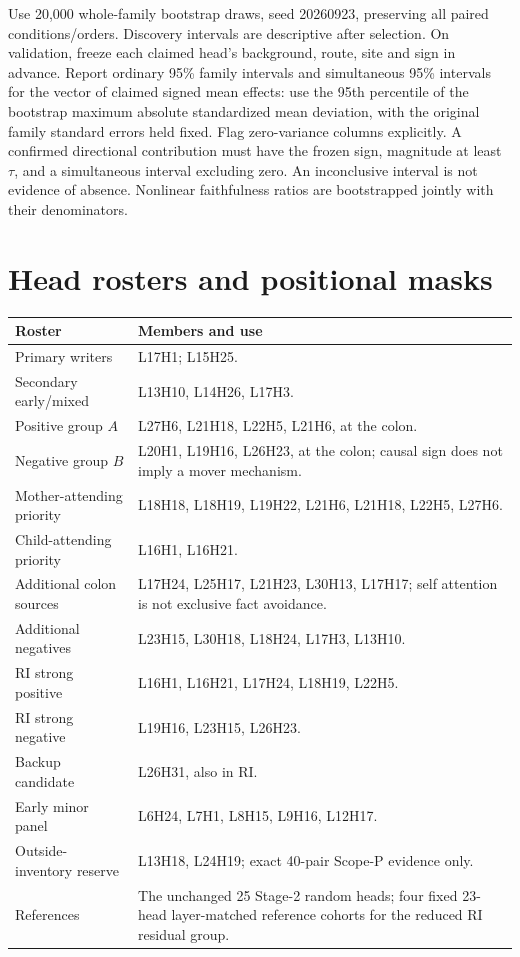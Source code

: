 \documentclass[11pt,a4paper]{article}
\begin{document}
Use 20,000 whole-family bootstrap draws, seed 20260923, preserving all paired
conditions/orders. Discovery intervals are descriptive after selection. On validation,
freeze each claimed head's background, route, site and sign in advance. Report ordinary
95\% family intervals and simultaneous 95\% intervals for the vector of claimed
signed mean effects: use the 95th percentile of the bootstrap maximum absolute
standardized mean deviation, with the original family standard errors held fixed.
Flag zero-variance columns explicitly. A confirmed directional contribution must have
the frozen sign, magnitude at least $\tau$, and a simultaneous interval excluding
zero. An inconclusive interval is not evidence of absence. Nonlinear faithfulness
ratios are bootstrapped jointly with their denominators.

\section{Head rosters and positional masks}
\label{sec:rosters}
\begin{longtable}{p{}p{}}
\toprule Roster & Members and use \\\midrule
Primary writers & L17H1; L15H25. \\
Secondary early/mixed & L13H10, L14H26, L17H3. \\
Positive group $A$ & L27H6, L21H18, L22H5, L21H6, at the colon. \\
Negative group $B$ & L20H1, L19H16, L26H23, at the colon; causal sign does not imply a mover mechanism. \\
Mother-attending priority & L18H18, L18H19, L19H22, L21H6, L21H18, L22H5, L27H6. \\
Child-attending priority & L16H1, L16H21. \\
Additional colon sources & L17H24, L25H17, L21H23, L30H13, L17H17; self attention is not exclusive fact avoidance. \\
Additional negatives & L23H15, L30H18, L18H24, L17H3, L13H10. \\
RI strong positive & L16H1, L16H21, L17H24, L18H19, L22H5. \\
RI strong negative & L19H16, L23H15, L26H23. \\
Backup candidate & L26H31, also in RI. \\
Early minor panel & L6H24, L7H1, L8H15, L9H16, L12H17. \\
Outside-inventory reserve & L13H18, L24H19; exact 40-pair Scope-P evidence only. \\
References & The unchanged 25 Stage-2 random heads; four fixed 23-head layer-matched reference cohorts for the reduced RI residual group. \\
\bottomrule
\end{longtable}
\end{document}
